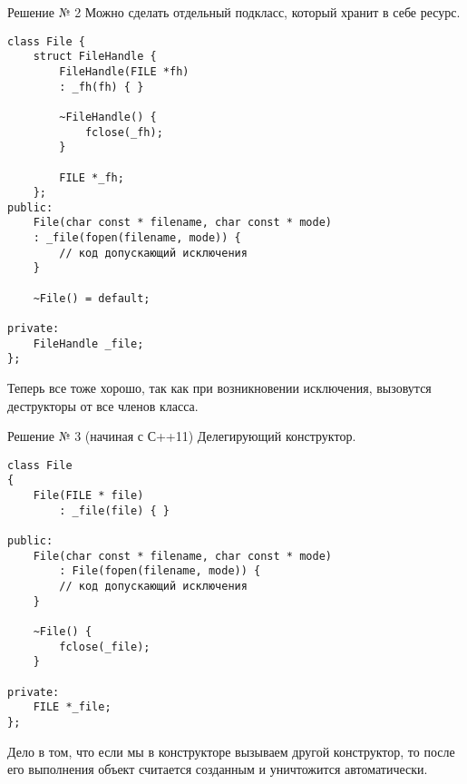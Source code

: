 Решение № 2
Можно сделать отдельный подкласс, который хранит в себе ресурс.
\begin{verbatim}
class File {
    struct FileHandle {
        FileHandle(FILE *fh)
        : _fh(fh) { }

        ~FileHandle() {
            fclose(_fh);
        }

        FILE *_fh;
    };
public:
    File(char const * filename, char const * mode)
    : _file(fopen(filename, mode)) {
        // код допускающий исключения
    }

    ~File() = default;

private:
    FileHandle _file;
};
\end{verbatim}

Теперь все тоже хорошо, так как при возникновении исключения, вызовутся деструкторы от все членов класса.

Решение № 3 (начиная с С++11)
Делегирующий конструктор.
\begin{verbatim}
class File
{
    File(FILE * file)
        : _file(file) { }

public:
    File(char const * filename, char const * mode)
        : File(fopen(filename, mode)) {
        // код допускающий исключения
    }

    ~File() {
        fclose(_file);
    }

private:
    FILE *_file;
};
\end{verbatim}

Дело в том, что если мы в конструкторе вызываем другой конструктор, то после его выполнения объект считается созданным и уничтожится автоматически.
